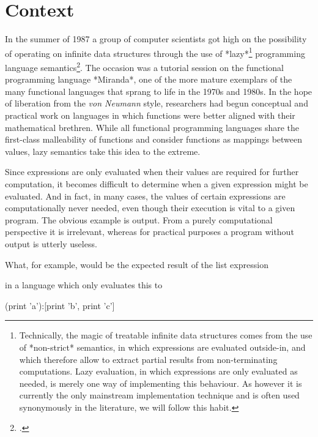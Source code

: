 \chapter{Context}

In the summer of 1987 a group of computer scientists got high on the
possibility of operating on infinite data structures through the use of
*lazy*\footnote{Technically, the magic of treatable infinite data
structures comes from the use of *non-strict* semantics, in which
expressions are evaluated outside-in, and which therefore allow to
extract partial results from non-terminating computations. Lazy
evaluation, in which expressions are only evaluated as needed, is merely
one way of implementing this behaviour. As however it is currently the
only mainstream implementation technique and is often used synonymously
in the literature, we will follow this habit.} programming language
semantics\footcite[p. 3]{hask-history}. The occasion was a tutorial
session on the functional programming language *Miranda*, one of the
more mature exemplars of the many functional languages that sprang to
life in the 1970s and 1980s. In the hope of liberation from the
\emph{von Neumann} style, researchers had begun conceptual and practical
work on languages in which functions were better aligned with their
mathematical brethren. While all functional programming languages share
the first-class malleability of functions and consider functions as
mappings between values, lazy semantics take this idea to the extreme.

Since expressions are only evaluated when their values are required for
further computation, it becomes difficult to determine when a given
expression might be evaluated. And in fact, in many cases, the values of
certain expressions are computationally never needed, even though their
execution is vital to a given program. The obvious example is output.
From a purely computational perspective it is irrelevant, whereas for
practical purposes a program without output is utterly useless.

What, for example, would be the expected result of the list expression

\begin{code}
\end{code}

in a language which only evaluates this to

\begin{code}
  (print 'a'):[print 'b', print 'c']
\end{code}

